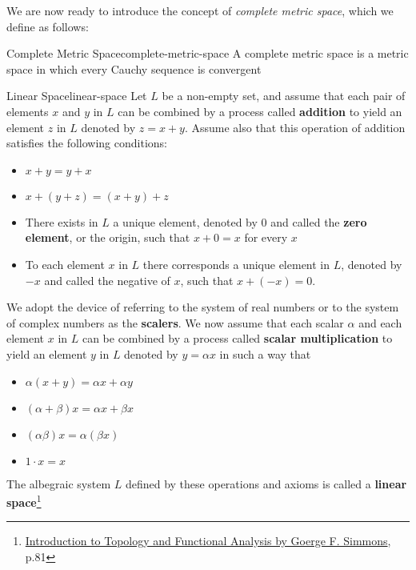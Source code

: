 We are now ready to introduce the concept of \textit{complete metric space}, which we define as follows:

\begin{Definition}{Complete Metric Space}{complete-metric-space}
    A complete metric space is a metric space in which every Cauchy sequence is convergent
\end{Definition}

\begin{Definition}{Linear Space}{linear-space}
    Let $L$ be a non-empty set, and assume that each pair of elements $x$ and $y$ in $L$ can be combined by a process
    called \textbf{addition} to yield an element $z$ in $L$ denoted by $z = x + y$. Assume also that this operation of
    addition satisfies the following conditions:

    \begin{itemize}
        \item $x + y = y + x$
        \item $x + (y + z) = (x + y) + z$
        \item There exists in $L$ a unique element, denoted by $0$ and called the \textbf{zero element}, or the origin,
              such that $x + 0 = x$ for every $x$
        \item To each element $x$ in $L$ there corresponds a unique element in $L$, denoted by $-x$ and called the
              negative of $x$, such that $x + (-x) = 0$.
    \end{itemize}

    We adopt the device of referring to the system of real numbers or to the system of complex numbers as the
    \textbf{scalers}. We now assume that each scalar $\alpha$ and each element $x$ in $L$ can be combined by a process
    called \textbf{scalar multiplication} to yield an element $y$ in $L$ denoted by $y = \alpha x$ in such a way that

    \begin{itemize}
        \item $\alpha(x + y) = \alpha x + \alpha y$
        \item $(\alpha + \beta)x = \alpha x + \beta x$
        \item $(\alpha\beta)x = \alpha(\beta x)$
        \item $1 \cdot x = x$
    \end{itemize}

    The albegraic system $L$ defined by these operations and axioms is called a
    \textbf{linear space}\footnote{\href{https://trello.com/c/3EPccNTa}{Introduction to Topology and Functional Analysis by Goerge F. Simmons}, p.81}
\end{Definition}

